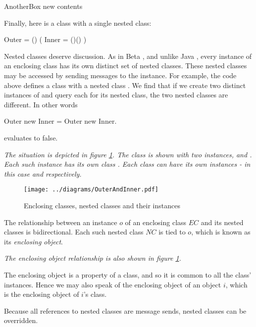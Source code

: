\documentclass{article}
\begin{document}
\begin{newspeak}
AnotherBox new contents
\end{newspeak}

Finally, here is a class with a single nested class:

\begin{newspeak}
\CLASS Outer = () (
   \PUBLIC \CLASS Inner = ()()
)
\end{newspeak}

Nested classes deserve discussion. As in Beta \cite{BetaBook}, and unlike Java \cite{GoslingJoySteeleBracha05}, every instance of an enclosing class has its own distinct set of nested classes. These nested classes may be accessed by sending messages to the instance. For example, the code above defines a class  with a nested class . We find that if we create two distinct instances of  and query each for its nested class, the two nested classes are different. In other words

\begin{newspeak}
Outer new Inner = Outer new Inner.
\end{newspeak}

evaluates to false. 

{\it The situation is depicted in figure \ref{nested}. The class  is shown with two instances,  and . Each such instance has its own class .  Each  class can have its own instances - in this case  and  respectively.

\begin{figure}
\texttt{[image: ../diagrams/OuterAndInner.pdf]}
\caption{Enclosing classes, nested classes and their instances}
\label{nested}
\end{figure}
}

The relationship between an instance $o$ of an enclosing class $EC$ and its nested classes is bidirectional. Each such nested class $NC$ is tied to $o$, which is known as its {\em enclosing object}. 

{\it The enclosing object relationship is also shown in  figure \ref{nested}.}

The enclosing object is a property of a class, and so it is common to all the class' instances. Hence we may also speak of the enclosing object of an object $i$, which is the enclosing object of $i$'s class.

Because all references to nested classes are message sends, nested classes can be overridden.
\end{document}
